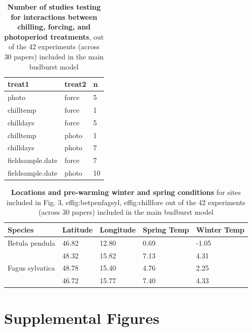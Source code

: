 \documentclass{article}
\begin{document}
\begin{footnotesize}
\begin{table}[ht]
\centering
\caption{\textbf{Number of studies testing for interactions between chilling, forcing, and photoperiod treatments}, out of the 42 experiments (across 30 papers) included in the main budburst model} 
\label{tab:intxn}
\begingroup\footnotesize
\begin{tabular}{|p{}|p{}|p{}|}
  \hline
treat1 & treat2 & n \\ 
  \hline
photo & force &   5 \\ 
  chilltemp & force &   1 \\ 
  chilldays & force &   5 \\ 
  chilltemp & photo &   1 \\ 
  chilldays & photo &   7 \\ 
  fieldsample.date & force &   7 \\ 
  fieldsample.date & photo &  10 \\ 
  \end{tabular}
\endgroup
\end{table}

\begin{table}[ht]
\centering
\caption{\textbf{Locations and pre-warming winter and spring conditions} for sites included in Fig. 3, 
ef{fig:betpenfagsyl}, 
ef{fig:chillfore} out of the 42 experiments (across 30 papers) included in the main budburst model} 
\label{tab:clim}
\begingroup\footnotesize
\begin{tabular}{|p{}|p{}|p{}|p{}|p{}|}
  \hline
Species & Latitude & Longitude & Spring Temp & Winter Temp \\ 
  \hline
Betula pendula & 46.82 & 12.80 & 0.69 & -1.05 \\ 
   & 48.32 & 15.82 & 7.13 & 4.31 \\ 
  Fagus sylvatica & 48.78 & 15.40 & 4.76 & 2.25 \\ 
   & 46.72 & 15.77 & 7.40 & 4.33 \\ 
   \hline
\end{tabular}
\endgroup
\end{table}\end{footnotesize} 
\newpage

\section* {Supplemental Figures}
\end{document}
